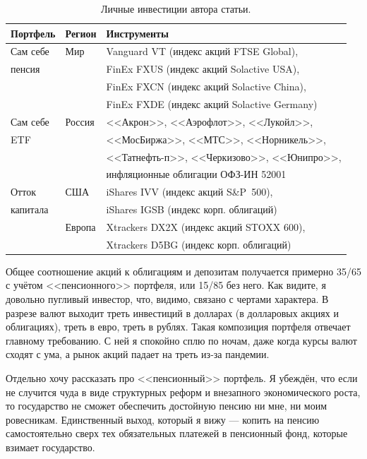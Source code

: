 \begin{table}[ht]
\centering
\begin{tabular}{l|l|l}
Портфель  & Регион & Инструменты \\
\hline
Сам себе  & Мир    & Vanguard VT (индекс акций FTSE Global), \\
пенсия    &        & FinEx FXUS (индекс акций Solactive USA), \\ 
          &        & FinEx FXCN (индекс акций Solactive China), \\
          &        & FinEx FXDE (индекс акций Solactive Germany) \\
\hline
Сам себе  & Россия & <<Акрон>>, <<Аэрофлот>>, <<Лукойл>>, \\
ETF       &        & <<МосБиржа>>, <<МТС>>, <<Норникель>>,\\
          &        & <<Татнефть-п>>, <<Черкизово>>, <<Юнипро>>, \\
          &        & инфляционные облигации ОФЗ-ИН 52001 \\
\hline
Отток     & США    & iShares IVV (индекс акций S\&P~500), \\
капитала  &        & iShares IGSB (индекс корп. облигаций) \\
\cline{2-3}
          & Европа & Xtrackers DX2X (индекс акций STOXX 600), \\
          &        & Xtrackers D5BG (индекс корп. облигаций)
\end{tabular}
\caption{Личные инвестиции автора статьи.}
\label{personal_portfolios}
\end{table}

Общее соотношение акций к облигациям и депозитам получается примерно 35/65 с 
учётом <<пенсионного>> портфеля, или 15/85 без него. Как видите, я довольно 
пугливый инвестор, что, видимо, связано с чертами характера. В разрезе валют 
выходит треть инвестиций в долларах (в долларовых акциях и облигациях), треть в 
евро, треть в рублях. Такая композиция портфеля отвечает главному требованию. С 
ней я спокойно сплю по ночам, даже когда курсы валют сходят с ума, а рынок 
акций падает на треть из-за пандемии.

Отдельно хочу рассказать про <<пенсионный>> портфель. Я убеждён, что если не 
случится чуда в виде структурных реформ и внезапного экономического роста, то 
государство не сможет обеспечить достойную пенсию ни мне, ни моим ровесникам. 
Единственный выход, который я вижу --- копить на пенсию самостоятельно сверх 
тех обязательных платежей в пенсионный фонд, которые взимает государство.

